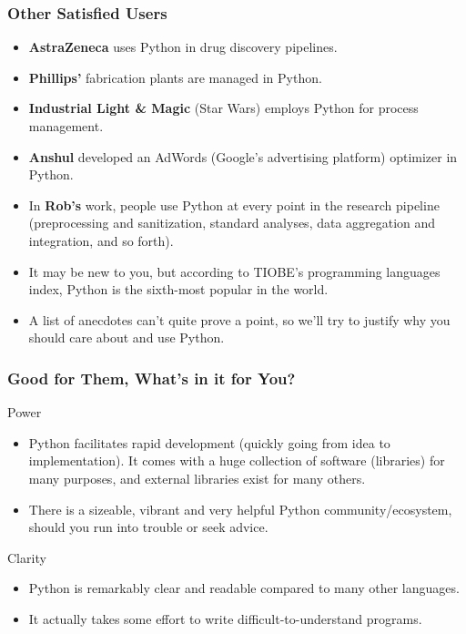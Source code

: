 \documentclass[10pt]{beamer}
\begin{document}
\begin{frame}
  \frametitle{Other Satisfied Users}
  \begin{itemize}
    \item \textbf{AstraZeneca} uses Python in drug discovery pipelines.
    \item \textbf{Phillips'} fabrication plants are managed in Python.
    \item \textbf{Industrial Light \& Magic} (Star Wars) employs Python for process management.
    \item \textbf{Anshul} developed an AdWords (Google's advertising platform) optimizer in Python.
    \item In \textbf{Rob's} work, people use Python at every point in the research pipeline (preprocessing and sanitization, standard analyses, data aggregation and integration, and so forth).
    \item It may be new to you, but according to TIOBE's programming languages index, Python is the sixth-most popular in the world.
    \item A list of anecdotes can't quite prove a point, so we'll try to justify why you should care about and use Python.
  \end{itemize}
\end{frame}

\begin{frame}
  \frametitle{Good for Them, What's in it for You?}
  \begin{block}{Power}
    \begin{itemize}
      \item Python facilitates rapid development (quickly going from idea to implementation).
        It comes with a huge collection of software (libraries) for many purposes, and external libraries exist for many others.
      \item There is a sizeable, vibrant and very helpful Python community/ecosystem, should you run into trouble or seek advice.
    \end{itemize}
  \end{block}
  \begin{block}{Clarity}
    \begin{itemize}
      \item Python is remarkably clear and readable compared to many other languages.
      \item It actually takes some effort to write difficult-to-understand programs.
    \end{itemize}
  \end{block}
\end{frame}
\end{document}
